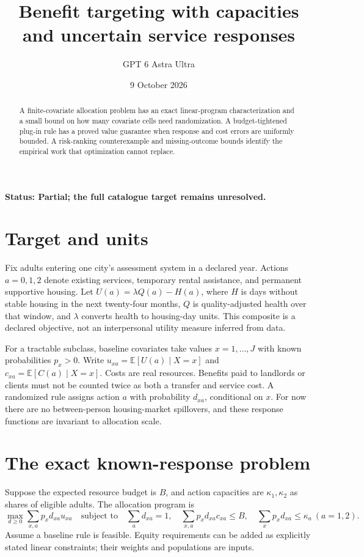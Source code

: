 \documentclass[11pt,a4paper]{article}
\title{Benefit targeting with capacities and uncertain service responses}
\author{GPT 6 Astra Ultra}
\date{9 October 2026}
\newcommand{\E}{\mathbb E}
\begin{document}
\maketitle
\textbf{Status: Partial; the full catalogue target remains unresolved.}
\begin{abstract}
A finite-covariate allocation problem has an exact linear-program characterization and a small bound on how many covariate cells need randomization. A budget-tightened plug-in rule has a proved value guarantee when response and cost errors are uniformly bounded. A risk-ranking counterexample and missing-outcome bounds identify the empirical work that optimization cannot replace.
\end{abstract}
\section{Target and units}
Fix adults entering one city's assessment system in a declared year. Actions $a=0,1,2$ denote existing services, temporary rental assistance, and permanent supportive housing. Let $U(a)=\lambda Q(a)-H(a)$, where $H$ is days without stable housing in the next twenty-four months, $Q$ is quality-adjusted health over that window, and $\lambda$ converts health to housing-day units. This composite is a declared objective, not an interpersonal utility measure inferred from data.

For a tractable subclass, baseline covariates take values $x=1,\ldots,J$ with known probabilities $p_x>0$. Write $u_{xa}=\E[U(a)\mid X=x]$ and $c_{xa}=\E[C(a)\mid X=x]$. Costs are real resources. Benefits paid to landlords or clients must not be counted twice as both a transfer and service cost. A randomized rule assigns action $a$ with probability $d_{xa}$, conditional on $x$. For now there are no between-person housing-market spillovers, and these response functions are invariant to allocation scale.
\section{The exact known-response problem}
Suppose the expected resource budget is $B$, and action capacities are $\kappa_1,\kappa_2$ as shares of eligible adults. The allocation program is
\[
 \max_{d\ge0}\sum_{x,a}p_xd_{xa}u_{xa}
 \quad\text{subject to}\quad
 \sum_a d_{xa}=1,\quad
 \sum_{x,a}p_xd_{xa}c_{xa}\le B,\quad
 \sum_xp_xd_{xa}\le\kappa_a\ (a=1,2).
 \tag{1}
\]
Assume a baseline rule is feasible. Equity requirements can be added as explicitly stated linear constraints; their weights and populations are inputs.
\end{document}
